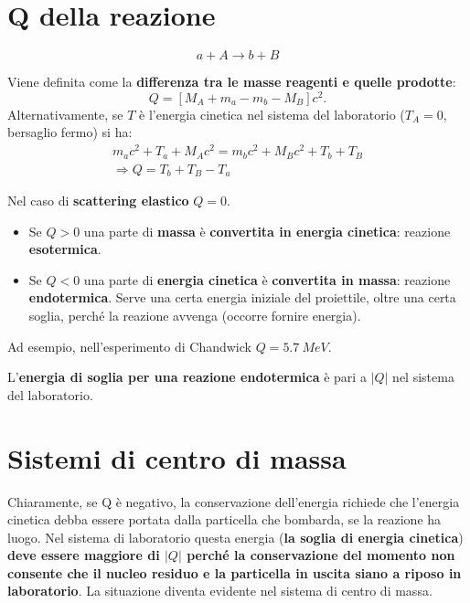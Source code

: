 \documentclass[a4paper,11pt,twoside,openany]{book}
\theoremstyle{definition}
\theoremstyle{plain}
\theoremstyle{plain}
\theoremstyle{definition}
\begin{document}
\section{Q della reazione} %
$$a+A\longrightarrow b+B$$

Viene definita come la \textbf{differenza tra le masse reagenti e quelle prodotte}:
\begin{equation}
Q=\left[M_A+m_a-m_b-M_B\right]c^2.
\end{equation}
Alternativamente, se $T$ è l'energia cinetica nel sistema del laboratorio ($T_A=0$, bersaglio fermo) si ha:
\begin{equation}
\begin{split}
m_ac^2+T_a+M_Ac^2=m_bc^2+M_Bc^2+T_b+T_B \\
\Longrightarrow Q=T_b+T_B-T_a
\end{split}
\end{equation}

Nel caso di \textbf{scattering elastico} $Q=0$.

\begin{itemize}
\item Se $Q>0$ una parte di \textbf{massa} è \textbf{convertita in energia cinetica}: reazione \textbf{esotermica}.
\item Se $Q<0$ una parte di \textbf{energia cinetica} è \textbf{convertita in massa}: reazione \textbf{endotermica}. Serve una certa energia iniziale del proiettile, oltre una certa soglia, perché la reazione avvenga (occorre fornire energia).
\end{itemize}

Ad esempio, nell'esperimento di Chandwick $Q=\SI{5.7}{MeV}$.

L'\textbf{energia di soglia per una reazione endotermica} è pari a $|Q|$ nel sistema del laboratorio.

\section{Sistemi di centro di massa} %
Chiaramente, se Q è negativo, la conservazione dell'energia richiede che l'energia cinetica debba essere portata dalla particella che bombarda, se la reazione ha luogo. Nel sistema di laboratorio questa energia (\textbf{la soglia di energia cinetica}) \textbf{deve essere maggiore di $|Q|$ perché la conservazione del momento non consente che il nucleo residuo e la particella in uscita siano a riposo in laboratorio}. La situazione diventa evidente nel sistema di centro di massa.
\end{document}
